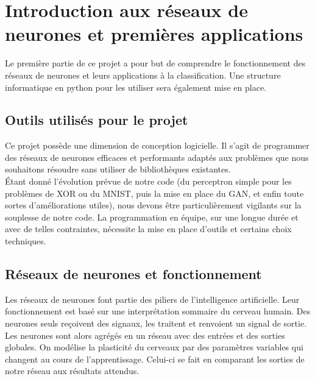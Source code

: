 

\chapter{Introduction aux réseaux de neurones et premières applications}
Le première partie de ce projet a pour but de comprendre le fonctionnement des réseaux de neurones et leurs applications à la classification. Une structure informatique en python pour les utiliser sera également mise en place.

\section{Outils utilisés pour le projet}

Ce projet possède une dimension de conception logicielle. Il s'agit de programmer des réseaux de neurones efficaces et performants adaptés aux problèmes que nous souhaitons résoudre sans utiliser de bibliothèques existantes.\\
Étant donné l'évolution prévue de notre code (du perceptron simple pour les problèmes de XOR ou du MNIST, puis la mise en place du GAN, et enfin toute sortes d'améliorations utiles), nous devons être particulièrement vigilants sur la souplesse de notre code. La programmation en équipe, sur une longue durée et avec de telles contraintes, nécessite la mise en place d'outils et certains choix techniques.

\section{Réseaux de neurones et fonctionnement}


Les réseaux de neurones font partie des piliers de l'intelligence artificielle. Leur fonctionnement est basé sur une interprétation sommaire du cerveau humain. Des neurones seuls reçoivent des signaux, les traitent et renvoient un signal de sortie. Les neurones sont alors agrégés en un réseau avec des entrées et des sorties globales. On modélise la plasticité du cerveaux par des paramètres variables qui changent au cours de l'apprentissage. Celui-ci se fait en comparant les sorties de notre réseau aux résultats attendus.

